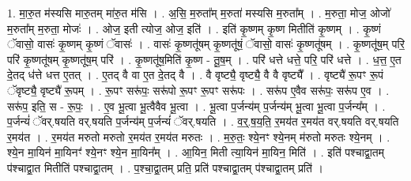 \documentclass[17pt]{extarticle}
\begin{document}
1. मा॒रु॒त म॑स्यसि मारु॒तम् मा॑रु॒त म॑सि । . अ॒सि॒ म॒रुता᳚म् म॒रुता॑ मस्यसि म॒रुता᳚म् । . म॒रुता॒ मोज॒ ओजो॑ म॒रुता᳚म् म॒रुता॒ मोजः॑ । . ओज॒ इती त्योज॒ ओज॒ इति॑ । . इति॑ कृ॒ष्णम् कृ॒ष्ण मितीति॑ कृ॒ष्णम् । . कृ॒ष्णं ॅवासो॒ वासः॑ कृ॒ष्णम् कृ॒ष्णं ॅवासः॑ । . वासः॑ कृ॒ष्णतू॑षम् कृ॒ष्णतू॑षं॒ ॅवासो॒ वासः॑ कृ॒ष्णतू॑षम् । . कृ॒ष्णतू॑ष॒म् परि॒ परि॑ कृ॒ष्णतू॑षम् कृ॒ष्णतू॑ष॒म् परि॑ । . कृ॒ष्णतू॑ष॒मिति॑ कृ॒ष्ण - तू॒ष॒म् । . परि॑ धत्ते धत्ते॒ परि॒ परि॑ धत्ते । . ध॒त्त॒ ए॒त दे॒तद् ध॑त्ते धत्त ए॒तत् । . ए॒तद् वै वा ए॒त दे॒तद् वै । . वै वृष्ट्यै॒ वृष्ट्यै॒ वै वै वृष्ट्यै᳚ । . वृष्ट्यै॑ रू॒पꣳ रू॒पं ॅवृष्ट्यै॒ वृष्ट्यै॑ रू॒पम् । . रू॒पꣳ सरू॑पः॒ सरू॑पो रू॒पꣳ रू॒पꣳ सरू॑पः । . सरू॑प ए॒वैव सरू॑पः॒ सरू॑प ए॒व । . सरू॑प॒ इति॒ स - रू॒पः॒ । . ए॒व भू॒त्वा भू॒त्वैवैव भू॒त्वा । . भू॒त्वा प॒र्जन्य॑म् प॒र्जन्य॑म् भू॒त्वा भू॒त्वा प॒र्जन्य᳚म् । . प॒र्जन्यं॑ ॅवर्.षयति वर्.षयति प॒र्जन्य॑म् प॒र्जन्यं॑ ॅवर्.षयति । . व॒र्॒.ष॒य॒ति॒ र॒मय॑त र॒मय॑त वर्.षयति वर्.षयति र॒मय॑त । . र॒मय॑त मरुतो मरुतो र॒मय॑त र॒मय॑त मरुतः । . म॒रु॒तः॒ श्ये॒नꣳ श्ये॒नम् म॑रुतो मरुतः श्ये॒नम् । . श्ये॒न मा॒यिन॑ मा॒यिनꣳ॑ श्ये॒नꣳ श्ये॒न मा॒यिन᳚म् । . आ॒यिन॒ मिती त्या॒यिन॑ मा॒यिन॒ मिति॑ । . इति॑ पश्चाद्वा॒तम् प॑श्चाद्वा॒त मितीति॑ पश्चाद्वा॒तम् । . प॒श्चा॒द्वा॒तम् प्रति॒ प्रति॑ पश्चाद्वा॒तम् प॑श्चाद्वा॒तम् प्रति॑ । \newline
\end{document}
